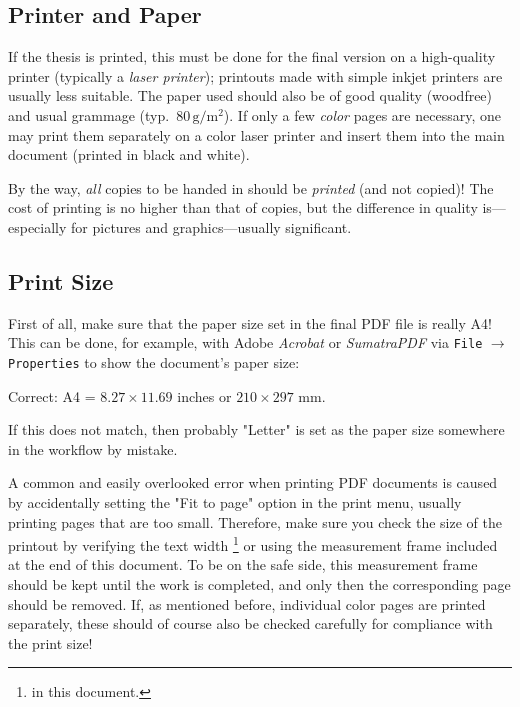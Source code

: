 \subsection{Printer and Paper}

If the thesis is printed, this must be done for the final version on a
high-quality printer (typically a \emph{laser printer}); printouts made with
simple inkjet printers are usually less suitable. The paper used should also be of good quality (woodfree)
and usual grammage (typ.\ $80\,\mathrm{g} / \mathrm{m}^2$). If only a few
\emph{color} pages are necessary, one may print them separately on a color laser
printer and insert them into the main document (printed in black and white).

By the way, \emph{all} copies to be handed in should be \emph{printed} (and not 
copied)! The cost of printing is no higher than that of copies, but the difference
in quality is---especially for pictures and graphics---usually significant.


\subsection{Print Size}

First of all, make sure that the paper size set in the final PDF file is really
\textrm{A4}! This can be done, for example, with Adobe \emph{Acrobat} or 
\emph{SumatraPDF} via \texttt{File} $\rightarrow$ \texttt{Properties} 
to show the document's paper size:
%
\begin{center}
	\textrm{Correct:} A4 = $8.27 \times 11.69$ inches or $210 \times 297$ mm.
\end{center}
%
If this does not match, then probably "Letter" is set as the paper size somewhere
in the workflow by mistake.

A common and easily overlooked error when printing PDF documents is caused by 
accidentally setting the "Fit to page" option in the print menu, usually printing 
pages that are too small. Therefore, make sure you check the size of the printout 
by verifying the text width%
\footnote{\Convert[unit=mm]{\the\textwidth}	in this document.} %
or using the measurement frame included at the end of this document.
To be on the safe side, this measurement frame should be kept until the work 
is completed, and only then the corresponding page should be removed.
If, as mentioned before, individual color pages are printed separately, these 
should of course also be checked carefully for compliance with the print size!